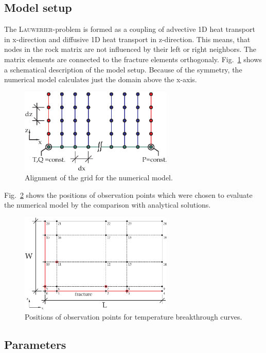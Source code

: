 \subsection{Model setup}

The \textsc{Lauwerier}-problem is formed as a coupling of advective 1D heat transport in x-direction and diffusive 1D heat transport in z-direction. This means, that nodes in the rock matrix are not influenced by their left or right neighbors. The matrix elements are connected to the fracture elements orthogonaly. Fig.~\ref{fig-lauwerier-grid} shows a schematical description of the model setup. Because of the symmetry, the numerical model calculates just the domain above the x-axis. 
\begin{figure}[h]
\centering
\includegraphics[width=0.65\textwidth]{T/figures/lauwerier-grid.eps}
\caption{\label{fig-lauwerier-grid}Alignment of the grid for the numerical model.}
\end{figure}
Fig.~\ref{fig-lauwerier-scheme} shows the positions of observation points which were chosen to evaluate the numerical model by the comparison with analytical solutions. 
\begin{figure}[h]
\centering
\includegraphics[width=0.65\textwidth]{T/figures/lauwerier-scheme.eps}
\caption{\label{fig-lauwerier-scheme}Positions of observation points for temperature breakthrough curves.}
\end{figure}

\subsection{Parameters}

